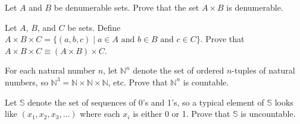 \begin{exercise}\label{exer:products}
Let $A$ and $B$ be denumerable sets.  Prove that the set $A\times B$ is
denumerable.
\end{exercise}

\begin{exercise}\label{exer:powers}
Let $A$, $B$, and $C$ be sets.  Define $A\times B\times C=\{ (a,b,c)\mid a\in A \mbox{ and } b\in B \mbox{ and } c\in C\}$.  Prove that $A\times B\times C\equiv (A\times B)\times C$.
\end{exercise}

\begin{exercise}\label{exer:Ncubed}\markit
For each natural number $n$, let $\mathbb N^n$ denote the set of ordered $n$-tuples of natural numbers, so $\mathbb N^3=\mathbb N\times\mathbb N \times\mathbb N$, etc.  Prove that $\mathbb N^n$ is countable.
\end{exercise}

\begin{exercise}\label{exer:zeroone}\markit
Let $\mathbb S$ denote the set of sequences of 0's and 1's, so a typical element of $\mathbb S$ looks like $(x_1,x_2,x_3,\ldots)$ where each $x_i$ is either 0 or 1. Prove that $\mathbb S$ is uncountable.
\end{exercise}

\clearpage
